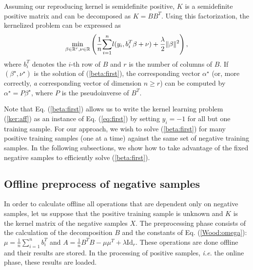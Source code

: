 


Assuming our reproducing kernel is semidefinite positive, 
$K$ is a semidefinite positive matrix and can be decomposed as $K=BB^T$.
Using this factorization, the kernelized problem can be expressed as 
\begin{equation}
\min_{\beta\in\mathbb R^r,\nu\in\mathbb R} \left( \dfrac{1}{n}\displaystyle{\sum_{i=1}^n} l(y_i, b_i^T\beta+\nu)+\dfrac{\lambda}{2}\|\beta\|^2\right), \label{beta:first}
\end{equation}
where $b_i^T$ denotes the $i$-th row of $B$ and $r$ is the number of columns of $B$. 
If $(\beta^\star, \nu^\star)$ is the solution of (\ref{beta:first}), the corresponding vector $\alpha^\star$ (or, more correctly, \textit{a} corresponding vector of dimension $n\geq r$) 
can be computed by $\alpha^\star=P\beta^\star$, where $P$ is the pseudoinverse of $B^T$.

Note that Eq. (\ref{beta:first}) allows us to write the kernel learning problem (\ref{ker:aff}) as an instance of Eq. (\ref{eq:first}) by setting $y_i=-1$ for all but one training sample. For our approach, we wish to solve (\ref{beta:first}) for many positive training samples (one at a time) against the same set of negative training samples. In the following subsections, we show how to take advantage of the fixed negative samples to efficiently solve (\ref{beta:first}).

\subsection{Offline preprocess of negative samples}\label{offline}
In order to calculate offline all operations that are dependent only on negative samples, let us suppose that the positive training sample is unknown and $K$ is the kernel matrix of the negative samples $X$.
The preprocessing phase consists of the calculation of the decomposition $B$ and the constants of Eq. (\ref{Wood:omega}): $\mu = \frac{1}{n}\sum_{i=1}^n b_i^T$ and $A = \frac{1}{n}B^TB-\mu\mu^T +\lambda\mathrm{Id}_r.$
These operations are done offline and their results are stored. In the processing of positive samples, \emph{i.e.} the online phase, these results are loaded.

